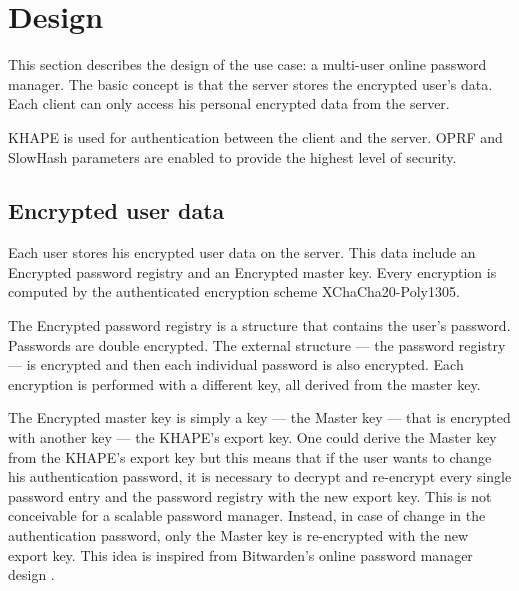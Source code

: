 ﻿\documentclass[../report.tex]{subfiles}
\begin{document}

\section{Design}
This section describes the design of the use case: a multi-user online password manager.
The basic concept is that the server stores the encrypted user's data. 
Each client can only access his personal encrypted data from the server.

KHAPE is used for authentication between the client and the server. OPRF and SlowHash parameters are enabled to provide the highest level of security.



\subsection{Encrypted user data}
Each user stores his encrypted user data on the server. This data include an Encrypted password registry and an Encrypted master key. Every encryption is computed by the authenticated encryption scheme XChaCha20-Poly1305.

The Encrypted password registry is a structure that contains the user's password. Passwords are double encrypted. The external structure --- the password registry --- is encrypted and then each individual password is also encrypted. Each encryption is performed with a different key, all derived from the master key.

The Encrypted master key is simply a key --- the Master key --- that is encrypted with another key --- the KHAPE's export key. 
One could derive the Master key from the KHAPE's export key but this means that if the user wants to change his authentication password, it is necessary to decrypt and re-encrypt every single password entry and the password registry with the new export key. This is not conceivable for a scalable password manager. Instead, in case of change in the authentication password, only the Master key is re-encrypted with the new export key. This idea is inspired from Bitwarden's online password manager design \cite{Bitwarden_Paper}.

% 
% 
% 
% 
\end{document}
